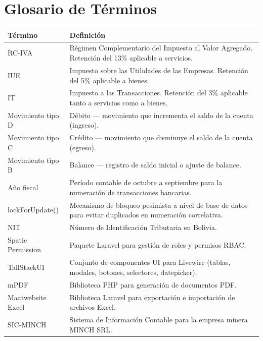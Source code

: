 \documentclass[stu]{apa7}
\begin{document}
\newpage

\section{Glosario de Términos}

\begin{longtable}{|L{3.5cm}|L{11cm}|}
\hline
{}
\textbf{Término} & \textbf{Definición} \\
\hline
RC-IVA & Régimen Complementario del Impuesto al Valor Agregado. Retención del 13\% aplicable a servicios. \\
\hline
IUE & Impuesto sobre las Utilidades de las Empresas. Retención del 5\% aplicable a bienes. \\
\hline
IT & Impuesto a las Transacciones. Retención del 3\% aplicable tanto a servicios como a bienes. \\
\hline
Movimiento tipo D & Débito --- movimiento que incrementa el saldo de la cuenta (ingreso). \\
\hline
Movimiento tipo C & Crédito --- movimiento que disminuye el saldo de la cuenta (egreso). \\
\hline
Movimiento tipo B & Balance --- registro de saldo inicial o ajuste de balance. \\
\hline
Año fiscal & Período contable de octubre a septiembre para la numeración de transacciones bancarias. \\
\hline
lockForUpdate() & Mecanismo de bloqueo pesimista a nivel de base de datos para evitar duplicados en numeración correlativa. \\
\hline
NIT & Número de Identificación Tributaria en Bolivia. \\
\hline
Spatie Permission & Paquete Laravel para gestión de roles y permisos RBAC. \\
\hline
TallStackUI & Conjunto de componentes UI para Livewire (tablas, modales, botones, selectores, datepicker). \\
\hline
mPDF & Biblioteca PHP para generación de documentos PDF. \\
\hline
Maatwebsite Excel & Biblioteca Laravel para exportación e importación de archivos Excel. \\
\hline
SIC-MINCH & Sistema de Información Contable para la empresa minera MINCH SRL. \\
\hline
\end{longtable}
\end{document}
